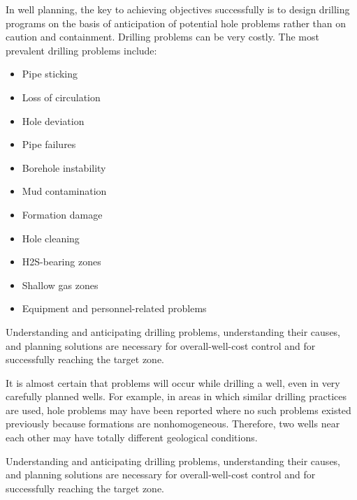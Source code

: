 \begin{itemize}
In well planning, the key to achieving objectives successfully is to design drilling programs on the
 basis of anticipation of potential hole problems rather than on caution and containment. 
 Drilling problems can be very costly. The most prevalent drilling problems include:

\vspace{1em}

\begin{itemize}

\item Pipe sticking
\item Loss of circulation
\item Hole deviation
\item Pipe failures
\item Borehole instability
\item Mud contamination
\item Formation damage
\item Hole cleaning
\item H2S-bearing zones
\item Shallow gas zones
\item Equipment and personnel-related problems

\end{itemize}
    
\vspace{1em}

Understanding and anticipating drilling problems, understanding their causes,
and planning solutions are necessary for overall-well-cost control and for successfully
reaching the target zone. 

\vspace{1em}

It is almost certain that problems will occur while drilling a well, even in very carefully planned wells. 
For example, in areas in which similar drilling practices are used, hole problems may have been reported 
where no such problems existed previously because formations are nonhomogeneous. Therefore, two wells near
each other may have totally different geological conditions.

\vspace{1em}

Understanding and anticipating drilling problems, understanding their causes, and planning solutions
are necessary for overall-well-cost control and for successfully reaching the target zone. 

\end{itemize}




